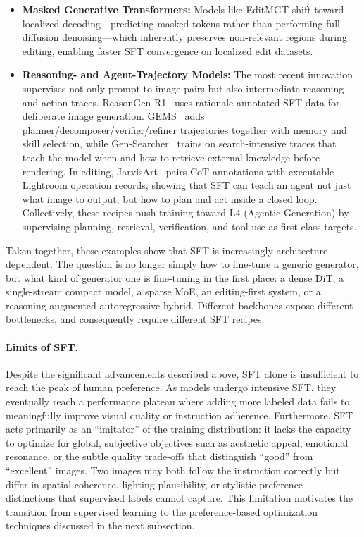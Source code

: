 \documentclass{llmxive}
\begin{document}
\begin{itemize}[leftmargin=*,itemsep=2pt]
    \item \textbf{Masked Generative Transformers:} Models like EditMGT shift toward localized decoding---predicting masked tokens rather than performing full diffusion denoising---which inherently preserves non-relevant regions during editing, enabling faster SFT convergence on localized edit datasets.
    \item \textbf{Reasoning- and Agent-Trajectory Models:} The most recent innovation supervises not only prompt-to-image pairs but also intermediate reasoning and action traces. ReasonGen-R1~\citep{zhang2025reasongen} uses rationale-annotated SFT data for deliberate image generation. GEMS~\citep{he2026gems} adds planner/decomposer/verifier/refiner trajectories together with memory and skill selection, while Gen-Searcher~\citep{feng2026gen} trains on search-intensive traces that teach the model when and how to retrieve external knowledge before rendering. In editing, JarvisArt~\citep{lin2025jarvisart} pairs CoT annotations with executable Lightroom operation records, showing that SFT can teach an agent not just what image to output, but how to plan and act inside a closed loop. Collectively, these recipes push training toward L4 (Agentic Generation) by supervising planning, retrieval, verification, and tool use as first-class targets.
\end{itemize}

Taken together, these examples show that SFT is increasingly architecture-dependent. The question is no longer simply how to fine-tune a generic generator, but what kind of generator one is fine-tuning in the first place: a dense DiT, a single-stream compact model, a sparse MoE, an editing-first system, or a reasoning-augmented autoregressive hybrid. Different backbones expose different bottlenecks, and consequently require different SFT recipes.

\paragraph{Limits of SFT.}

Despite the significant advancements described above, SFT alone is insufficient to reach the peak of human preference. As models undergo intensive SFT, they eventually reach a performance plateau where adding more labeled data fails to meaningfully improve visual quality or instruction adherence. Furthermore, SFT acts primarily as an ``imitator'' of the training distribution: it lacks the capacity to optimize for global, subjective objectives such as aesthetic appeal, emotional resonance, or the subtle quality trade-offs that distinguish ``good'' from ``excellent'' images. Two images may both follow the instruction correctly but differ in spatial coherence, lighting plausibility, or stylistic preference---distinctions that supervised labels cannot capture. This limitation motivates the transition from supervised learning to the preference-based optimization techniques discussed in the next subsection.
\end{document}
